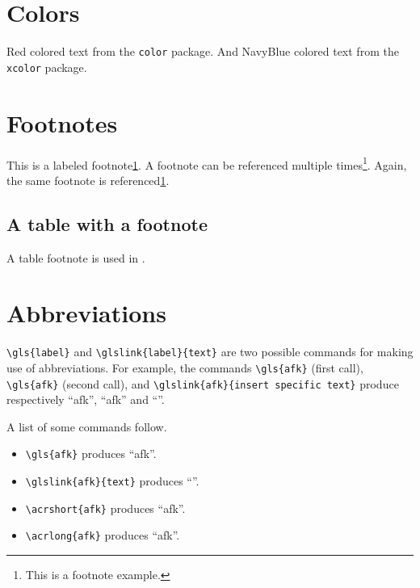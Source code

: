 \section{Colors}
\label{sec:colors}

{\color{red} Red colored text} from the \texttt{color} package.
{\color{NavyBlue} And NavyBlue colored text} from the \texttt{xcolor} package.

\section{Footnotes}
\label{sec:footnotes}

This is a labeled footnote\cref{foot:example}. A footnote can be referenced multiple times\footnote{\label{foot:example}This is a footnote example.}. Again, the same footnote is referenced\cref{foot:example}.

\subsection{A table with a footnote}
\label{ssec:a-table-with-a-footnote}

A table footnote is used in .



\section{Abbreviations}
\label{sec:abbreviations}

\verb+\gls{label}+ and \verb+\glslink{label}{text}+ are two possible commands for making use of abbreviations. For example, the commands \verb+\gls{afk}+ (first call), \verb+\gls{afk}+ (second call), and \verb+\glslink{afk}{insert specific text}+ produce respectively ``\gls{afk}'', ``\gls{afk}'' and ``''.

A list of some commands follow.

\begin{itemize}
\item
\verb+\gls{afk}+ produces ``\gls{afk}''.
\item
\verb+\glslink{afk}{text}+ produces ``''.
\item
\verb+\acrshort{afk}+ produces ``\acrshort{afk}''.
\item
\verb+\acrlong{afk}+ produces ``\acrlong{afk}''.
\end{itemize}

